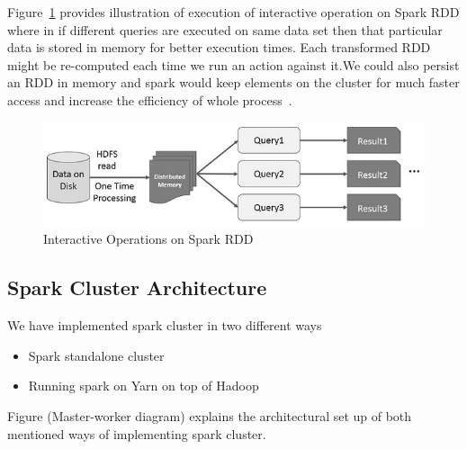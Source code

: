 Figure~\ref{fig:interactive-spark} provides illustration of execution of 
interactive operation on Spark RDD where in if different queries are executed on
 same data set then that particular data is stored in memory for better 
 execution times. Each transformed RDD might be re-computed each time we run an 
 action against it.We could also persist an RDD in memory and spark would keep 
 elements on the cluster for much faster access and increase the efficiency of 
 whole process~\cite{hid-sp18-410-spark-RDD}.





\begin{figure}[!ht]
  \centering\includegraphics[width=\columnwidth]{images/interactiveSpark.png}
   \caption{Interactive Operations on Spark RDD
   ~\cite{hid-sp18-410-spark-RDD}}\label{fig:interactive-spark}
\end{figure}



\subsection{Spark Cluster Architecture}

We have implemented spark cluster in two different ways

\begin{itemize}

\item Spark standalone cluster
\item Running spark on Yarn on top of Hadoop

\end{itemize}

Figure (Master-worker diagram) explains the architectural set up of both 
mentioned ways of implementing spark cluster.

